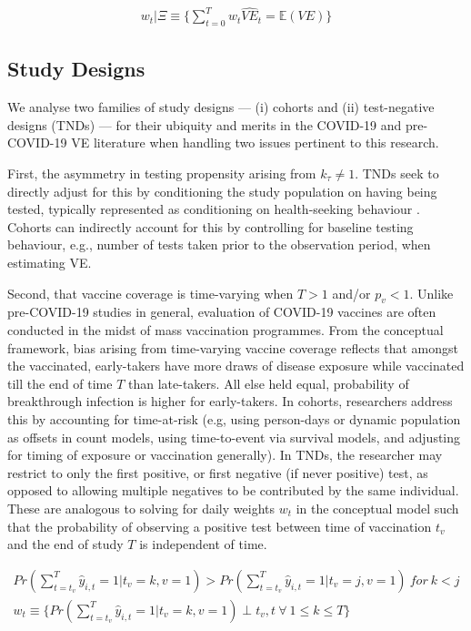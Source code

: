 \documentclass[12pt]{article}
\begin{document}
\begin{eqnarray}
	w_t | \Xi \equiv \{ \sum_{t=0}^{T} w_{t} \hat{VE}_{t} = \mathbb{E}(VE) \}
\end{eqnarray}

\subsection{Study Designs}
We analyse two families of study designs --- (i) cohorts and (ii) test-negative designs (TNDs) --- for their ubiquity and merits in the COVID-19 and pre-COVID-19 VE literature when handling two issues pertinent to this research. 

First, the asymmetry in testing propensity arising from $k_{\tau} \neq 1$. TNDs seek to directly adjust for this by conditioning the study population on having being tested, typically represented as conditioning on health-seeking behaviour \citep{crowcroft2018framework}. Cohorts can indirectly account for this by controlling for baseline testing behaviour, e.g., number of tests taken prior to the observation period, when estimating VE. 

Second, that vaccine coverage is time-varying when $T>1$ and/or $p_v < 1$. Unlike pre-COVID-19 studies in general, evaluation of COVID-19 vaccines are often conducted in the midst of mass vaccination programmes. From the conceptual framework, bias arising from time-varying vaccine coverage reflects that amongst the vaccinated, early-takers have more draws of disease exposure while vaccinated till the end of time $T$ than late-takers. All else held equal, probability of breakthrough infection is higher for early-takers. In cohorts, researchers address this by accounting for time-at-risk (e.g, using person-days or dynamic population as offsets in count models, using time-to-event via survival models, and adjusting for timing of exposure or vaccination generally). In TNDs, the researcher may restrict to only the first positive, or first negative (if never positive) test, as opposed to allowing multiple negatives to be contributed by the same individual. These are analogous to solving for daily weights $w_t$ in the conceptual model such that the probability of observing a positive test between time of vaccination $t_v$ and the end of study $T$ is independent of time.

\begin{eqnarray}
	Pr(\sum_{t=t_v}^{T}\hat{y}_{i,t}=1 | t_v = k, v = 1) > Pr(\sum_{t=t_v}^{T}\hat{y}_{i,t}=1 | t_v = j, v = 1) \ for \ k < j \\
	w_t \equiv \{ Pr(\sum_{t=t_v}^{T}\hat{y}_{i,t}=1 | t_v = k, v = 1) \perp t_v, t \ \forall \ 1 \leq k \leq T \}
\end{eqnarray}
\end{document}

